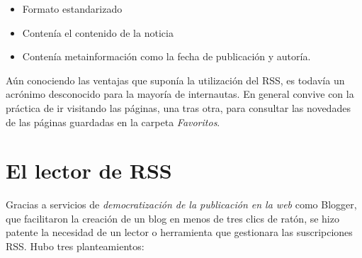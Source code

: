 \documentclass[12pt, a4paper,twoside]{book}
\begin{document}
\begin{itemize}
\item
  Formato estandarizado
\item
  Contenía el contenido de la noticia
\item
  Contenía metainformación como la fecha de publicación y autoría.
\end{itemize}
Aún conociendo las ventajas que suponía la utilización del RSS, es
todavía un acrónimo desconocido para la mayoría de internautas. En
general convive con la práctica de ir visitando las páginas, una
tras otra, para consultar las novedades de las páginas guardadas en
la carpeta \emph{Favoritos}.

\section{El lector de RSS}

Gracias a servicios de
\emph{democratización de la publicación en la web} como Blogger,
que facilitaron la creación de un blog en menos de tres clics de
ratón, se hizo patente la necesidad de un lector o herramienta que
gestionara las suscripciones RSS. Hubo tres planteamientos:
\end{document}
